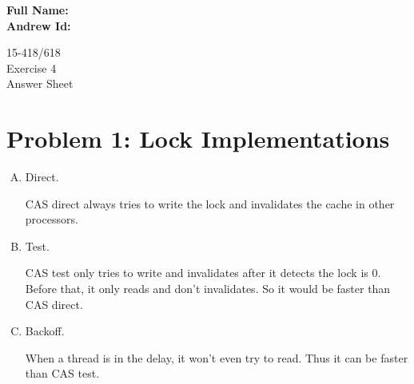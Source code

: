 \documentclass[11pt]{article}
\newenvironment{choice}{\begin{enumerate}[A.]}{\end{enumerate}}
\newenvironment{answer}{\begin{minipage}[c][2in]{\textwidth}}{\end{minipage}}
\begin{document}
\begin{flushright}                         
{\large\bf Full Name: \makebox[2in][l]{    
                                           
                                           
}} \\[1ex]                                 
                                           
{\large\bf Andrew Id: \makebox[2in][l]{\tt 
                                           
}} \\[1ex]                                 
\end{flushright}                           
\vspace*{0.3in}                            
\begin{center}
\LARGE
15-418/618 \\
Exercise 4
\\ Answer Sheet %
\end{center}

\section*{Problem 1: Lock Implementations}

\begin{choice}
\item Direct.

\begin{answer}
CAS direct always tries to write the lock and invalidates the cache in other processors. 
\end{answer}

\item Test.

\begin{answer}
CAS test only tries to write and invalidates after it detects the lock is 0. Before that, it 
only reads and don't invalidates. So it would be faster than CAS direct. 
\end{answer}


\item Backoff.

\begin{answer}

When a thread is in the delay, it won't even try to read. Thus it can be faster than CAS test. 

\end{answer}
\end{choice} 
\end{document}
